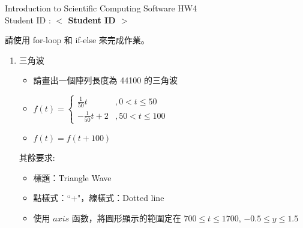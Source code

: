 \documentclass[12pt,a4paper]{article}
\newcommand{\placeholder}[1]{\textbf{$<$ #1 $>$}}
\newcommand{\idnumber}{\placeholder{Student ID}}
\begin{document}
\begin{CJK}{UTF8}{bsmi}
\begin{flushleft}Introduction to Scientific Computing Software HW4
\\Student ID : \idnumber{}\end{flushleft}

請使用 for-loop 和 if-else 來完成作業。
\begin{enumerate}
\item 三角波
\begin{itemize} 
\item 請畫出一個陣列長度為 44100 的三角波

\item $f(t)=\left\{\begin{array}{lc}\frac{1}{50}t&,0 < t\le50 \\ -\frac{1}{50}t+2 &,50 < t \le 100\end{array}\right.$
\item $f(t)=f(t+100)$
\end{itemize}
其餘要求:
\begin{itemize}
\item 標題：Triangle Wave
\item 點樣式：``+"，線樣式：Dotted line
\item 使用 $axis$ 函數，將圖形顯示的範圍定在 $700 \le t \le 1700$, $-0.5 \le y \le 1.5$
\end{itemize}
\end{enumerate}
\end{CJK}
\end{document}
